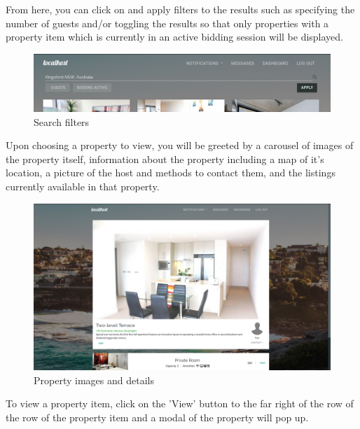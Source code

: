 From here, you can click on and apply filters to the results such as specifying
the number of guests and/or toggling the results so that only properties with a 
property item which is currently in an active bidding session will be displayed.

\begin{figure}[!h]
  \includegraphics[width=\linewidth]{assets/userManual/searchFilters.png}
  \caption{Search filters}
  \label{fig:searchFilters}
\end{figure}

Upon choosing a property to view, you will be greeted by a carousel of images of
the property itself, information about the property including a map of it's
location, a picture of the host and methods to contact them, and the listings
currently available in that property.

\begin{figure}[!h]
  \includegraphics[width=\linewidth]{assets/userManual/propertyPg.png}
  \caption{Property images and details}
  \label{fig:propertyPg}
\end{figure}

To view a property item, click on the 'View' button to the far right of the row
of the row of the property item and a modal of the property will pop up.

